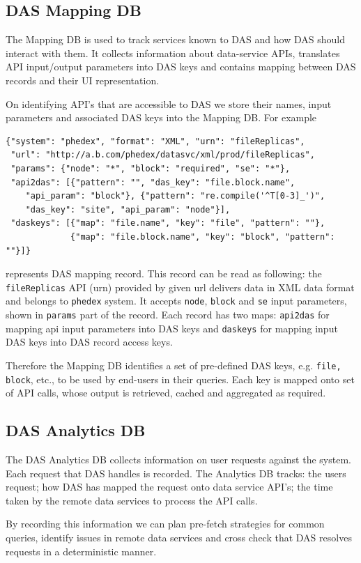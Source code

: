 \documentclass[1p,times]{elsarticle}
\begin{document}
\subsection{DAS Mapping DB\label{MappingDB}}
The Mapping DB is used to track services known to DAS and how DAS should interact with them.
It collects
information about data-service APIs, translates API input/output
parameters into DAS keys and contains mapping between DAS records
and their UI representation.

On identifying API's that are accessible to DAS we store
their names, input parameters and associated DAS keys
into the Mapping DB. For example
\begin{verbatim}
{"system": "phedex", "format": "XML", "urn": "fileReplicas",
 "url": "http://a.b.com/phedex/datasvc/xml/prod/fileReplicas", 
 "params": {"node": "*", "block": "required", "se": "*"}, 
 "api2das": [{"pattern": "", "das_key": "file.block.name", 
    "api_param": "block"}, {"pattern": "re.compile('^T[0-3]_')", 
    "das_key": "site", "api_param": "node"}], 
 "daskeys": [{"map": "file.name", "key": "file", "pattern": ""}, 
             {"map": "file.block.name", "key": "block", "pattern": ""}]}
\end{verbatim}
represents DAS mapping record.
This record can be read as following:
the \verb+fileReplicas+ API (urn) provided by given url delivers data in
XML data format and belongs to \verb+phedex+ system.
It accepts \verb+node+, \verb+block+ and \verb+se+ input parameters, shown in \verb+params+ part
of the record. Each record has two maps: \verb+api2das+ for mapping api input parameters into
DAS keys and \verb+daskeys+ for mapping input DAS keys into DAS record access keys.


Therefore the Mapping DB identifies a set of pre-defined DAS keys, 
e.g. \verb+file, block+, etc., to be used by end-users in their queries.
Each key is mapped onto set of API calls, whose output is retrieved,
cached and aggregated as required. 

\subsection{DAS Analytics DB}
The DAS Analytics DB collects information on user requests against the system.
Each request that DAS handles is recorded.
The Analytics DB tracks: the users request; how DAS has mapped the request 
onto data service API's; the time taken by the remote data services to 
process the API calls.

By recording this information we can plan pre-fetch strategies for common queries,
identify issues in remote data services and cross check that DAS resolves requests
in a deterministic manner.
\end{document}
